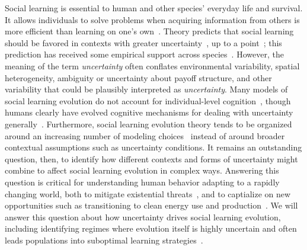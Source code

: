 \documentclass[letterpaper,11.5pt]{scrartcl}
\begin{document}
Social learning is essential to human and other species' everyday life and survival.
It allows individuals to solve problems when acquiring information from others is
more efficient than learning on one's own~\cite{Laland2004}. Theory predicts that
social learning should be favored in contexts with greater
uncertainty~\cite{BoydRicherson1985,Henrich1998}, up to a
point~\cite{Rogers1988,Feldman1996}; this prediction has received some empirical
support across species~\cite{McElreath2005,Kendal2018,Allen2019}.  However, the
meaning of the term \emph{uncertainty} often conflates environmental variability,
spatial heterogeneity, ambiguity or uncertainty about payoff structure, and other
variability that could be plausibly interpreted as \emph{uncertainty}.  Many models
of social learning evolution do not account for 
individual-level cognition~\cite{Heyes2016}, though humans
clearly have evolved cognitive mechanisms for dealing with 
uncertainty generally~\cite{Gershman2019,Schulz2019}.
Furthermore, social learning evolution theory tends to be organized around an
increasing number of modeling choices~\cite[Figure 1]{Kendal2018} instead
of around broader contextual assumptions such as uncertainty conditions. It remains
an outstanding question, then, to identify how different contexts and forms of
uncertainty might combine to affect social learning evolution in complex ways.
Answering this question is critical for understanding human behavior adapting to a
rapidly changing world, both to mitigate existential
threats~\cite{Moya2020,Jones2021}, and to captialize on new opportunities such as
transitioning to clean energy use and
production~\cite{NatureEnergyEditorialPromisesPremises2018,Brisbois2022}.
We will answer this question about how uncertainty drives social learning 
evolution, including
identifying regimes where evolution itself is highly uncertain and often 
leads populations into suboptimal learning strategies~\cite{Rogers1988}.
\end{document}
